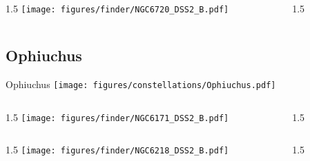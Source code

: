 \documentclass[final]{beamer}
\newlength{\colwidth}
\begin{document}
\begin{frame}[t]{}
  \begin{columns}[T]
    \begin{column}{1.5\colwidth}
      \centering
      \texttt{[image: figures/finder/NGC6720\_DSS2\_B.pdf]}
    \end{column}
    \begin{column}{1.5\colwidth}
      \Large
      
    \end{column}
  \end{columns}
  \vspace{\fill}
\end{frame}

\subsection{Ophiuchus}

\begin{frame}[t]{\LARGE Ophiuchus}
  \centering
  \texttt{[image: figures/constellations/Ophiuchus.pdf]}
\end{frame}


\begin{frame}[t]{}
  \begin{columns}[T]
    \begin{column}{1.5\colwidth}
      \centering
      \texttt{[image: figures/finder/NGC6171\_DSS2\_B.pdf]}
    \end{column}
    \begin{column}{1.5\colwidth}
      \Large
      
    \end{column}
  \end{columns}
  \vspace{\fill}
  \begin{columns}[T]
    \begin{column}{1.5\colwidth}
      \centering
      \texttt{[image: figures/finder/NGC6218\_DSS2\_B.pdf]}
    \end{column}
    \begin{column}{1.5\colwidth}
      \Large
      
    \end{column}
  \end{columns}
\end{frame}
\end{document}
